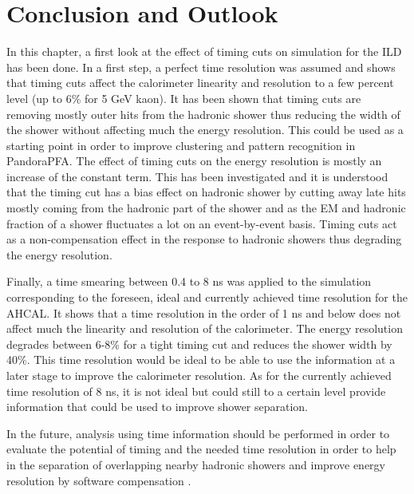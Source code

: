 \section{Conclusion and Outlook}

In this chapter, a first look at the effect of timing cuts on \geant simulation for the ILD has been done. In a first step, a perfect time resolution was assumed and shows that timing cuts affect the calorimeter linearity and resolution to a few percent level (up to 6\% for 5 GeV kaon). It has been shown that timing cuts are removing mostly outer hits from the hadronic shower thus reducing the width of the shower without affecting much the energy resolution. This could be used as a starting point in order to improve clustering and pattern recognition in PandoraPFA. The effect of timing cuts on the energy resolution is mostly an increase of the constant term. This has been investigated and it is understood that the timing cut has a bias effect on hadronic shower by cutting away late hits mostly coming from the hadronic part of the shower and as the EM and hadronic fraction of a shower fluctuates a lot on an event-by-event basis. Timing cuts act as a non-compensation effect in the response to hadronic showers thus degrading the energy resolution.

Finally, a time smearing between 0.4 to 8 ns was applied to the simulation corresponding to the foreseen, ideal and currently achieved time resolution for the AHCAL. It shows that a time resolution in the order of 1 ns and below does not affect much the linearity and resolution of the calorimeter. The energy resolution degrades between 6-8\% for a tight timing cut and reduces the shower width by 40\%. This time resolution would be ideal to be able to use the information at a later stage to improve the calorimeter resolution. As for the currently achieved time resolution of 8 ns, it is not ideal but could still to a certain level provide information that could be used to improve shower separation.

In the future, analysis using time information should be performed in order to evaluate the potential of timing and the needed time resolution in order to help in the separation of overlapping nearby hadronic showers and improve energy resolution by software compensation \cite{Benaglia2016}.
